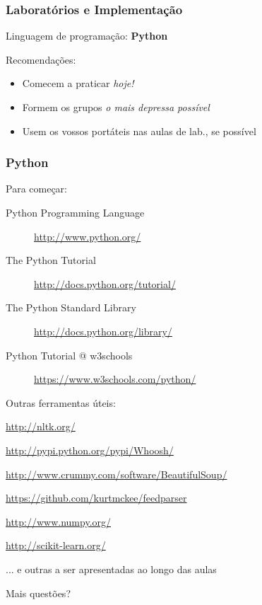 \documentclass{beamer}
\begin{document}
\begin{frame}
    \frametitle{Laboratórios e Implementação}
    \begin{center}
        Linguagem de programação: \textbf{Python} \\[.5\baselineskip]
    \end{center}
    \begin{block}{Recomendações:}
        \begin{itemize}
        \item Comecem a praticar \emph{hoje!}
        \item Formem os grupos \emph{o mais depressa possível}
        \item Usem os vossos portáteis nas aulas de lab., se possível
        \end{itemize}
    \end{block}
\end{frame}

\begin{frame}
    \frametitle{Python}    
    \begin{block}{Para começar:}
        \footnotesize
        \begin{description}
        \item[Python Programming Language] \url{http://www.python.org/}
        \item[The Python Tutorial] \url{http://docs.python.org/tutorial/}
        \item[The Python Standard Library] \url{http://docs.python.org/library/}
        \item[Python Tutorial @ w3schools] \url{https://www.w3schools.com/python/}
        \end{description}
    \end{block}
    \begin{block}{Outras ferramentas úteis:}
        \footnotesize
        \begin{description}
        \item[Natural Language Toolkit] \url{http://nltk.org/}
        \item[Whoosh] \url{http://pypi.python.org/pypi/Whoosh/}
        \item[Beautiful Soup] \url{http://www.crummy.com/software/BeautifulSoup/}
        \item[feedparser] \url{https://github.com/kurtmckee/feedparser}
        \item[NumPy] \url{http://www.numpy.org/}
        \item[scikit-learn] \url{http://scikit-learn.org/}
        \item ... e outras a ser apresentadas ao longo das aulas
        \end{description}
    \end{block}
\end{frame}

\begin{frame}
    \begin{block}{}
        \centering
        \Large
        Mais questões?
    \end{block}
\end{frame}
\end{document}
